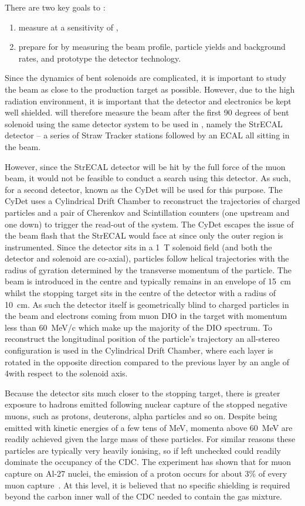 There are two key goals to \phaseI:
\begin{enumerate}
\item measure \mueconv at a sensitivity of \sensePI,
\item prepare for \phaseII by measuring the beam profile, particle yields and background rates, and prototype the detector technology.
\end{enumerate}
Since the dynamics of bent solenoids are complicated, it is important to study the beam as close to the production target as possible.
However, due to the high radiation environment, it is important that the detector and electronics be kept well shielded.
\phaseI will therefore measure the beam after the first 90 degrees of bent solenoid using the same detector system to be used in \phaseII, namely the \ac{StrECAL} detector -- a series of Straw Tracker stations  followed by an ECAL
all sitting in the beam.  

However, since the StrECAL detector will be hit by the full force of the muon beam, it would not be feasible to conduct a \mueconv search using this detector.
As such, for \phaseI a second detector, known as the \ac{CyDet} will be used for this purpose.
The \ac{CyDet} uses a Cylindrical Drift Chamber to reconstruct the trajectories of charged particles and a pair of Cherenkov and Scintillation counters (one upstream and one down) to trigger the read-out of the system.
The \ac{CyDet} escapes the issue of the beam flash that the \ac{StrECAL} would face at \phaseI since only the outer region is instrumented.
Since the detector sits in a 1~T solenoid field (and both the detector and solenoid are co-axial), particles follow helical trajectories with the radius of gyration determined by the transverse momentum of the particle.
The beam is introduced in the centre and typically remains in an envelope of 15~cm whilst the stopping target sits in the centre of the detector with a radius of 10~cm.
As such the detector itself is geometrically blind to charged particles in the beam and electrons coming from muon \ac{DIO} in the target with momentum less than 60~MeV/c which make up the majority of the \ac{DIO} spectrum.
To reconstruct the longitudinal position of the particle's trajectory an all-stereo configuration is used in the Cylindrical Drift Chamber, where each layer is rotated in the opposite direction compared to the previous layer by an angle of 4\degree with respect to the solenoid axis.

Because the \phaseI detector sits much closer to the stopping target, there is greater exposure to hadrons emitted following nuclear capture of the stopped negative muons, such as protons, deuterons, alpha particles and so on.
Despite being emitted with kinetic energies of a few tens of MeV, momenta above 60~MeV are readily achieved given the large mass of these particles.
For similar reasons these particles are typically very heavily ionising, so if left unchecked could readily dominate the occupancy of the \ac{CDC}.
The \alcap experiment has shown that for muon capture on Al-27 nuclei, the emission of a proton occurs for about 3\% of every muon capture~\cite{NamThesis}.
At this level, it is believed that no specific shielding is required beyond the carbon inner wall of the \ac{CDC} needed to contain the gas mixture.

